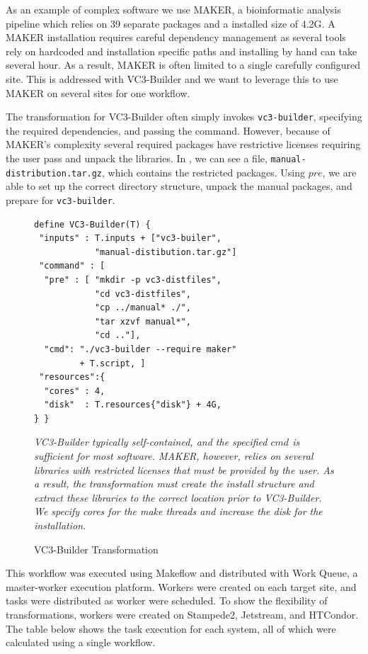 \documentclass[conference]{IEEEtran}
\begin{document}
As an example of complex software we use MAKER\cite{pmid18025269},
a bioinformatic analysis pipeline which relies
on 39 separate packages and a installed size of 4.2G.
A MAKER installation requires careful
dependency management as several tools rely
on hardcoded and installation specific paths
and installing by hand can take several hour.
As a result, MAKER is often limited to a single
carefully configured site.
This is addressed with VC3-Builder and
we want to leverage this to use MAKER 
on several sites for one workflow.

The transformation for VC3-Builder often
simply invokes {\tt vc3-builder},
specifying the required dependencies,
and passing the command.
However, because of MAKER's complexity several
required packages have restrictive licenses
requiring the user 
pass and unpack the libraries.
In , we can see a file,
{\tt manual-distribution.tar.gz}, which
contains the restricted packages.
Using $pre$, we are able to set up the
correct directory structure,
unpack the manual packages,
and prepare for {\tt vc3-builder}.


\begin{figure}
\begin{framed}
\begin{verbatim}
define VC3-Builder(T) {
 "inputs" : T.inputs + ["vc3-builer",
            "manual-distibution.tar.gz"]
 "command" : [
  "pre" : [ "mkdir -p vc3-distfiles",
            "cd vc3-distfiles",
            "cp ../manual* ./",
            "tar xzvf manual*",
            "cd .."],
  "cmd": "./vc3-builder --require maker"
         + T.script, ]
 "resources":{
  "cores" : 4,
  "disk"  : T.resources{"disk"} + 4G,
} }
\end{verbatim}
\end{framed}
\caption{VC3-Builder Transformation}
\small
\emph{VC3-Builder typically  
self-contained, and the specified
$cmd$ is sufficient for most software.
MAKER, however, relies on several libraries
with restricted licenses that must be
provided by the user. 
As a result, the transformation must
create the install structure and 
extract these libraries to the correct
location prior to VC3-Builder.
We specify cores for the make threads and 
increase the disk for the installation.
}
\label{vc3-builder}
\end{figure}

This workflow was executed using Makeflow
and distributed with Work Queue\cite{wq-python-pyhpc2011},
a master-worker execution platform. 
Workers were created on each target site,
and tasks were distributed as worker were 
scheduled.
To show the flexibility of transformations,
workers were created on Stampede2,
Jetstream, and HTCondor.
The table below shows the task execution
for each system, 
all of which were calculated using a single workflow.
\end{document}
